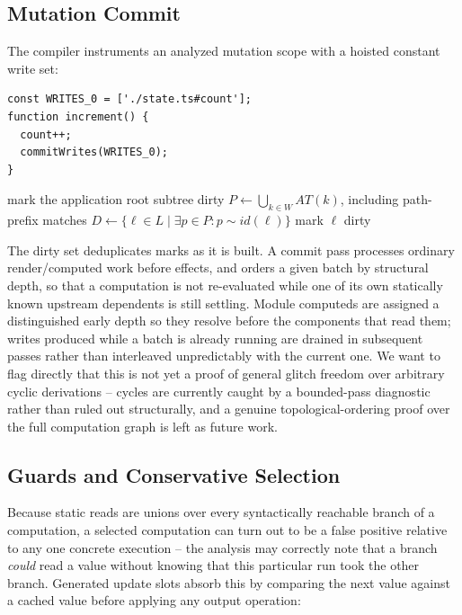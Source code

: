 \documentclass[conference]{IEEEtran}
\begin{document}
\subsection{Mutation Commit}

The compiler instruments an analyzed mutation scope with a hoisted constant
write set:

\begin{lstlisting}[caption={Generated commit for an imperative mutation scope}]
const WRITES_0 = ['./state.ts#count'];
function increment() {
  count++;
  commitWrites(WRITES_0);
}
\end{lstlisting}

\begin{algorithm}[h]
\caption{Static write routing}
\label{alg:commit}
\begin{algorithmic}[1]
    \State mark the application root subtree dirty
  \Else
    \State $P\gets\bigcup_{k\in W} AT(k)$, including path-prefix matches
    \State $D\gets\{\ell\in L\mid\exists p\in P:p\sim id(\ell)\}$
      \State mark $\ell$ dirty
    \EndFor
  \EndIf
\EndProcedure
\end{algorithmic}
\end{algorithm}

The dirty set deduplicates marks as it is built. A commit pass processes
ordinary render/computed work before effects, and orders a given batch by
structural depth, so that a computation is not re-evaluated while one of its
own statically known upstream dependents is still settling. Module computeds
are assigned a distinguished early depth so they resolve before the
components that read them; writes produced while a batch is already running
are drained in subsequent passes rather than interleaved unpredictably with
the current one. We want to flag directly that this is not yet a proof of
general glitch freedom over arbitrary cyclic derivations -- cycles are
currently caught by a bounded-pass diagnostic rather than ruled out
structurally, and a genuine topological-ordering proof over the full
computation graph is left as future work.

\subsection{Guards and Conservative Selection}

Because static reads are unions over every syntactically reachable branch of
a computation, a selected computation can turn out to be a false positive
relative to any one concrete execution -- the analysis may correctly note
that a branch \emph{could} read a value without knowing that this particular
run took the other branch. Generated update slots absorb this by comparing
the next value against a cached value before applying any output operation:
\end{document}
